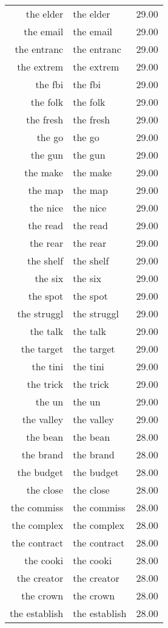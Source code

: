 \begin{table}[ht]
\begin{tabular}{rlr}
  the elder & the elder & 29.00 \\ 
  the email & the email & 29.00 \\ 
  the entranc & the entranc & 29.00 \\ 
  the extrem & the extrem & 29.00 \\ 
  the fbi & the fbi & 29.00 \\ 
  the folk & the folk & 29.00 \\ 
  the fresh & the fresh & 29.00 \\ 
  the go & the go & 29.00 \\ 
  the gun & the gun & 29.00 \\ 
  the make & the make & 29.00 \\ 
  the map & the map & 29.00 \\ 
  the nice & the nice & 29.00 \\ 
  the read & the read & 29.00 \\ 
  the rear & the rear & 29.00 \\ 
  the shelf & the shelf & 29.00 \\ 
  the six & the six & 29.00 \\ 
  the spot & the spot & 29.00 \\ 
  the struggl & the struggl & 29.00 \\ 
  the talk & the talk & 29.00 \\ 
  the target & the target & 29.00 \\ 
  the tini & the tini & 29.00 \\ 
  the trick & the trick & 29.00 \\ 
  the un & the un & 29.00 \\ 
  the valley & the valley & 29.00 \\ 
  the bean & the bean & 28.00 \\ 
  the brand & the brand & 28.00 \\ 
  the budget & the budget & 28.00 \\ 
  the close & the close & 28.00 \\ 
  the commiss & the commiss & 28.00 \\ 
  the complex & the complex & 28.00 \\ 
  the contract & the contract & 28.00 \\ 
  the cooki & the cooki & 28.00 \\ 
  the creator & the creator & 28.00 \\ 
  the crown & the crown & 28.00 \\ 
  the establish & the establish & 28.00 \\ 

\end{tabular}
\end{table}
